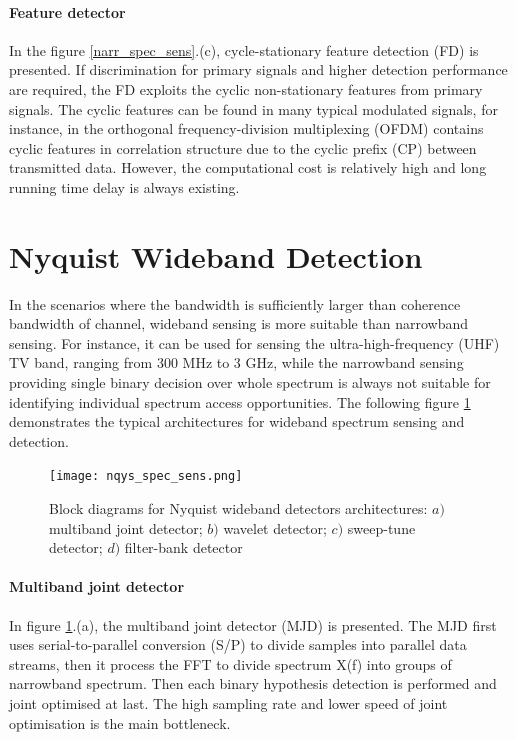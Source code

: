\paragraph{Feature detector}
In the figure \ref{narr_spec_sens}.(c), cycle-stationary feature detection (FD) \cite{enserink1994cyclostationary} is presented. If discrimination for primary signals and higher detection performance are required, the FD exploits the cyclic non-stationary features from primary signals. The cyclic features can be found in many typical modulated signals, for instance, in the orthogonal frequency-division multiplexing (OFDM) contains cyclic features in correlation structure due to the cyclic prefix (CP) between transmitted data. However, the computational cost is relatively high and long running time delay is always existing. 

\section{Nyquist Wideband Detection}\label{sct:wss}

\indent \indent In the scenarios where the bandwidth is sufficiently larger than coherence bandwidth of channel, wideband sensing is more suitable than narrowband sensing. For instance, it can be used for sensing the ultra-high-frequency (UHF) TV band, ranging from 300 MHz to 3 GHz, while the narrowband sensing providing single binary decision over whole spectrum is always not suitable for identifying individual spectrum access opportunities. The following figure \ref{nqys_spec_sens} demonstrates the typical architectures for wideband spectrum sensing and detection.

\begin{figure}
\centering
\texttt{[image: nqys\_spec\_sens.png]}
\caption{Block diagrams for Nyquist wideband detectors architectures: $a)$ multiband joint detector; $b)$ wavelet detector; $c)$ sweep-tune detector; $d)$ filter-bank detector}
\label{nqys_spec_sens}
\end{figure} 

\paragraph{Multiband joint detector}
In figure \ref{nqys_spec_sens}.(a), the multiband joint detector (MJD) \cite{quan2009optimal} is presented. The MJD first uses serial-to-parallel conversion (S/P) to divide samples into parallel data streams, then it process the FFT to divide spectrum X(f) into groups of narrowband spectrum. Then each binary hypothesis detection is performed and joint optimised at last. The high sampling rate and lower speed of joint optimisation is the main bottleneck.

